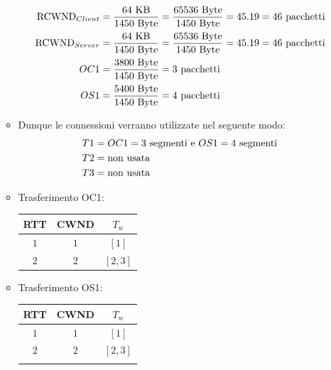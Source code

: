 \documentclass[10pt]{article}
\newcommand{\lightrule}{%
	\arrayrulecolor{black!30}%
	\midrule[\lightrulewidth]%
	\arrayrulecolor{black}}
\begin{document}
\begin{enumerate}
\begin{itemize}
		 	\begin{equation}
			\notag
			\begin{split}
				\textrm{RCWND}_{Client} & = \frac{64 \textrm{ KB}}{1450 \textrm{ Byte}} = \frac{65536 \textrm{ Byte}}{1450 \textrm{ Byte}} = 45.19 = 46 \textrm{ pacchetti}\\
				\textrm{RCWND}_{Server} & = \frac{64 \textrm{ KB}}{1450 \textrm{ Byte}} = \frac{65536 \textrm{ Byte}}{1450 \textrm{ Byte}} = 45.19 = 46 \textrm{ pacchetti}\\
				OC1 & = \frac{3800 \textrm{ Byte}}{1450 \textrm{ Byte}} = 3 \textrm{ pacchetti}\\
				OS1 & = \frac{5400 \textrm{ Byte}}{1450 \textrm{ Byte}} = 4 \textrm{ pacchetti}\\  
			\end{split}
			\end{equation}
			\item Dunque le connessioni verranno utilizzate nel seguente modo:
			\begin{equation}
				\notag
				\begin{split}
				T1 & = OC1 = 3 \textrm{ segmenti e } OS1 = 4 \textrm{ segmenti} \\
				T2 & = \textrm{non usata} \\
				T3 & = \textrm{non usata}
				\end{split}
			\end{equation}
			\item Trasferimento OC1:
			\begin{center}
				\centering
 				\begin{tabular}{@{} *{3}{c} @{}}
 				\toprule
 					\textbf{RTT} & \textbf{CWND} & \textbf{$T_w$} \\ 
 				\midrule
 					$1$ & $1$ & $[1]$ \\ 
				\lightrule
 					$2$ & $2$ & $[2,3]$ \\
				\bottomrule
				\end{tabular}
			\end{center}
			\newpage
			\item Trasferimento OS1:
			\begin{center}
				\centering
 				\begin{tabular}{@{} *{3}{c} @{}}
 				\toprule
 					\textbf{RTT} & \textbf{CWND} & \textbf{$T_w$} \\
 				\midrule
 					$1$ & $1$ & $[1]$ \\ 
				\lightrule
 					$2$ & $2$ & $[2,3]$ \\
 				\lightrule

\end{tabular}
\end{center}
\end{itemize}
\end{enumerate}
\end{document}
